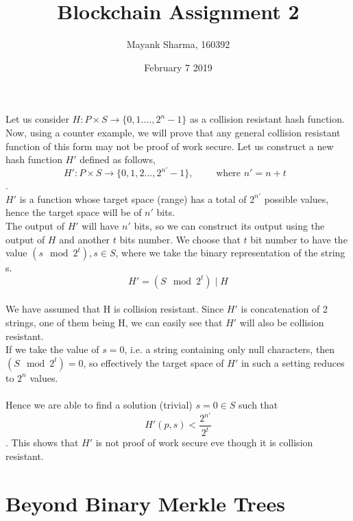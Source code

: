 \documentclass[12pt, a4paper]{article}
\title{Blockchain Assignment 2}
\author{Mayank Sharma, 160392}
\date{February 7 2019}
\begin{document}
\maketitle
\section{}
Let us consider $H:P \times S \rightarrow \{0,1....,2^n -1\}$ as a collision resistant hash function. Now, using a counter example, we will prove that any general collision resistant function of this form may not be proof of work secure. 
Let us construct a new hash function $H'$ defined as follows, \\
$$H': P \times S \rightarrow \{0,1,2...,2^{n'} -1 \}, \qquad \text{ where $n'=n+t$ }$$.\\
$H'$ is a function whose target space (range) has a total of $2^{n'}$ possible values, hence the target space will be of $n'$ bits. \\
The output of $H'$ will have $n'$ bits, so we can construct its output using the output of $H$ and another $t$ bits number. We choose that $t$ bit number to have the value $( s \mod 2^t ), s \in S$, where we take the binary representation of the string s.\\
$$H'=(S \mod 2^t ) \mid H$$\\
We have assumed that H is collision resistant. Since $H'$ is concatenation of 2 strings, one of them being H, we can easily see that $H'$ will also be collision resistant.\\ 
If we take the value of $s = 0$, i.e. a string containing only null characters, then $(S \mod 2^t ) = 0$, so effectively the target space of $H'$ in such a setting reduces to $2^n$ values. \\ \\

Hence we are able to find a solution (trivial) $s = 0 \in S$ such that $$H'(p,s) < \frac{2^{n'}}{2^t}$$. 
This shows that $H'$ is not proof of work secure eve though it is collision resistant.



\section{Beyond Binary Merkle Trees}
\end{document}
